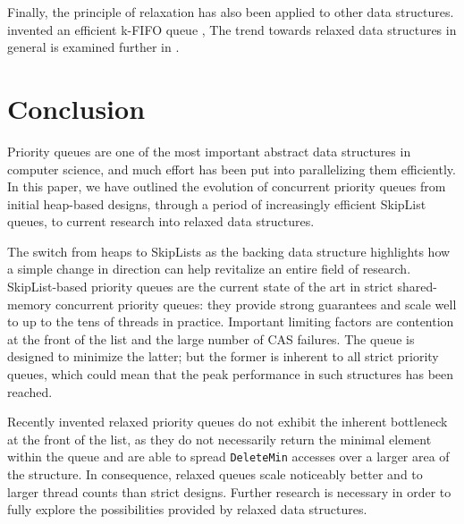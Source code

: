 \documentclass[a4paper,10pt]{article}
\begin{document}
Finally, the principle of relaxation has also been applied to other data structures.
\citeauthor{kirsch2012fast} invented an efficient k-FIFO queue \cite{kirsch2012fast},
The trend towards relaxed data structures in general is examined further in
\cite{shavit2011data,kirsch2012incorrect}.

\section{Conclusion} \label{sec:conclusion}

Priority queues are one of the most important abstract data structures in computer science,
and much effort has been put into parallelizing them efficiently. In this paper,
we have outlined the evolution of concurrent priority queues from initial heap-based designs,
through a period of increasingly efficient SkipList queues, to current research into relaxed data structures.

The switch from heaps to SkipLists as the backing data structure highlights how a simple change in
direction can help revitalize an entire field of research. SkipList-based priority queues are the current
state of the art in strict shared-memory concurrent priority queues: they provide strong guarantees
and scale well to up to the tens of threads in practice. Important limiting factors are contention
at the front of the list and the large number of \ac{CAS} failures.
The \citeauthor{linden2013skiplist} queue is designed
to minimize the latter; but the former is inherent to all strict priority queues, which could mean
that the peak performance in such structures has been reached.

Recently invented relaxed priority queues do not exhibit the inherent bottleneck at the front of the list,
as they do not necessarily return the minimal element within the queue and are able to spread
\lstinline|DeleteMin| accesses over a larger area of the structure. In consequence, relaxed queues scale noticeably
better and to larger thread counts than strict designs. Further research is necessary in order to fully
explore the possibilities provided by relaxed data structures.

\printbibliography
\end{document}
